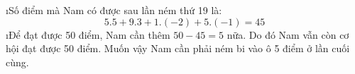 \begin{Answer}{36}
		\begin{enumerate}[a),leftmargin=*]
			\i	Số điểm mà Nam có được sau lần ném thứ 19 là:
			\[5.5 + 9.3 + 1.\left( { - 2} \right) + 5.\left( { - 1} \right) = 45\]
			\i	Để đạt được 50 điểm, Nam cần thêm $50-45 =5$ nữa. Do đó Nam vẫn còn cơ hội đạt được 50 điểm. Muốn vậy Nam cần phải ném bi vào ô 5 điểm ở lần cuối cùng.
		\end{enumerate}
	
\end{Answer}
